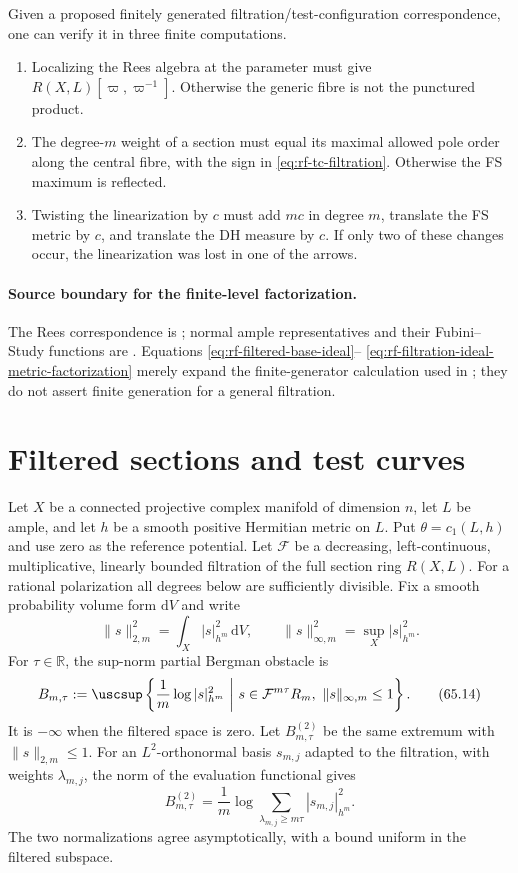 Given a proposed finitely generated filtration/test-configuration
correspondence, one can verify it in three finite computations.

\begin{enumerate}
\item Localizing the Rees algebra at the parameter must give
$R(X,L)[\varpi,\varpi^{-1}]$.  Otherwise the generic fibre is not the
punctured product.

\item The degree-$m$ weight of a section must equal its maximal allowed
pole order along the central fibre, with the sign in
\eqref{eq:rf-tc-filtration}.  Otherwise the FS maximum is reflected.

\item Twisting the linearization by $c$ must add $mc$ in degree $m$,
translate the FS metric by $c$, and translate the DH measure by $c$.
If only two of these changes occur, the linearization was lost in one of the
arrows.
\end{enumerate}

\paragraph{Source boundary for the finite-level factorization.}
The Rees correspondence is \cite[Proposition~2.15]{BHJ17}; normal ample representatives and their Fubini--Study functions are \cite[Proposition~2.30 and Theorem~2.31]{BJ22}.  Equations
\eqref{eq:rf-filtered-base-ideal}--
\eqref{eq:rf-filtration-ideal-metric-factorization} merely expand the
finite-generator calculation used in ; they do not
assert finite generation for a general filtration.

\section{Filtered sections and test curves}
\label{sec:rf-filtered-test-curves}

Let $X$ be a connected projective complex manifold of dimension $n$, let $L$ be ample, and let $h$ be a smooth positive Hermitian metric on $L$. Put $\theta=c_1(L,h)$ and use zero as the reference potential. Let $\mathcal F$ be a decreasing, left-continuous, multiplicative, linearly bounded filtration of the full section ring $R(X,L)$. For a rational polarization all degrees below are sufficiently divisible. Fix a smooth probability volume form $\mathrm dV$ and write
\[
 \|s\|_{2,m}^2=\int_X|s|_{h^m}^2\,\mathrm dV,
 \qquad \|s\|_{\infty,m}^2=\sup_X|s|_{h^m}^2.
\]
For $\tau\in\mathbb R$, the sup-norm partial Bergman obstacle is
\[
 B_{m,\tau}
 :=\uscsup\left\{\frac1m\log|s|_{h^m}^2\ \middle|\
 s\in\mathcal F^{m\tau}R_m,\ \|s\|_{\infty,m}\leq1\right\}.
\tag{65.14}\label{eq:rf-partial-bergman}
\]
It is $-\infty$ when the filtered space is zero. Let $B^{(2)}_{m,\tau}$ be the same extremum with $\|s\|_{2,m}\leq1$. For an $L^2$-orthonormal basis $s_{m,j}$ adapted to the filtration, with weights $\lambda_{m,j}$, the norm of the evaluation functional gives
\[
 B^{(2)}_{m,\tau}
   =\frac1m\log\sum_{\lambda_{m,j}\geq m\tau}|s_{m,j}|_{h^m}^2.
\]
The two normalizations agree asymptotically, with a bound uniform in the filtered subspace.

